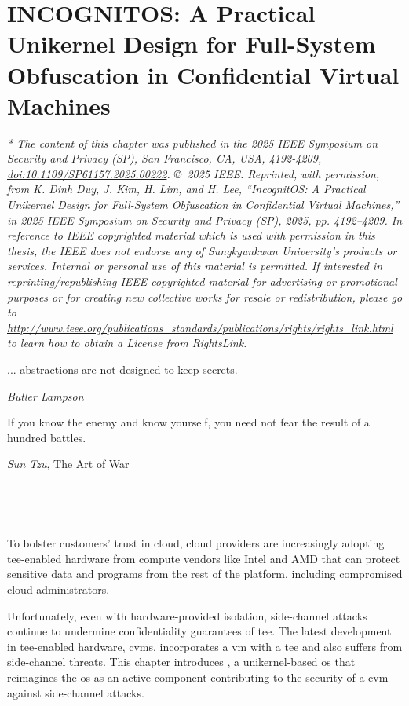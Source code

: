 \chapter{INCOGNITOS: A Practical Unikernel Design for Full-System Obfuscation in Confidential Virtual Machines}\label{chap:incognitos}

\emph{* The content of this chapter was published in the 2025 IEEE Symposium on Security and Privacy (SP), San Francisco, CA, USA, 4192-4209, \href{https://doi.org/10.1109/SP61157.2025.00222}{doi:10.1109/SP61157.2025.00222}. \copyright~2025 IEEE. Reprinted, with permission, from K. Dinh Duy, J. Kim, H. Lim, and H. Lee, ``IncognitOS: A Practical Unikernel Design for Full-System Obfuscation in Confidential Virtual Machines,'' in 2025 IEEE Symposium on Security and Privacy (SP), 2025, pp. 4192--4209. In reference to IEEE copyrighted material which is used with permission in this thesis, the IEEE does not endorse any of Sungkyunkwan University's products or services. Internal or personal use of this material is permitted. If interested in reprinting/republishing IEEE copyrighted material for advertising or promotional purposes or for creating new collective works for resale or redistribution, please go to \url{http://www.ieee.org/publications_standards/publications/rights/rights_link.html} to learn how to obtain a License from RightsLink.}
\\



\epigraph{
	... abstractions are not designed to keep secrets.
}{\textit{Butler Lampson}~\cite{lampson2015perspectives}}

\epigraph{
	If you know the enemy and know yourself, you need not fear the result of a hundred battles.
}{\textit{Sun Tzu}, The Art of War}

\

\

\clearpage


To bolster customers' trust in cloud, cloud providers are increasingly adopting \gls{tee}-enabled hardware from compute vendors like Intel and AMD that can protect sensitive data and programs from the rest of the platform, including compromised cloud administrators.

Unfortunately, even with hardware-provided isolation, side-channel attacks continue to undermine confidentiality guarantees of \gls{tee}.
The latest development in \gls{tee}-enabled hardware, \glspl{cvm}, incorporates a \gls{vm} with a \gls{tee} and also suffers from side-channel threats.
This chapter introduces \incognitos, a unikernel-based \gls{os} that reimagines the \gls{os} as an active component contributing to the security of a \gls{cvm} against side-channel attacks.

